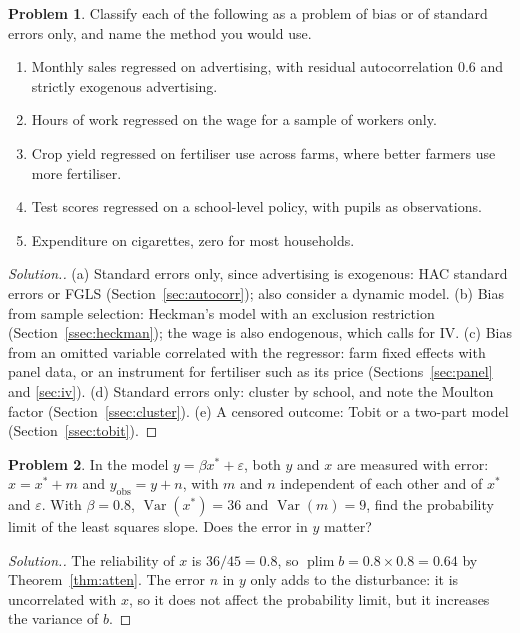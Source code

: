 \documentclass[11pt,a4paper]{article}
\numberwithin{equation}{section}
\DeclareMathOperator{\Var}{Var}
\DeclareMathOperator{\plim}{plim}
\theoremstyle{definition}
\newtheorem{problemx}{Problem}[subsection]
\newenvironment{problem}{\begin{problemx}}{\end{problemx}}
\newenvironment{solution}
  {\renewcommand{\qedsymbol}{}\begin{proof}[\textit{Solution}.]}
  {\end{proof}}
\begin{document}
\begin{problem}
Classify each of the following as a problem of bias or of standard errors only, and name the method you would use.
\begin{enumerate}[label=(\alph*)]
\item Monthly sales regressed on advertising, with residual autocorrelation $0.6$ and strictly exogenous advertising.
\item Hours of work regressed on the wage for a sample of workers only.
\item Crop yield regressed on fertiliser use across farms, where better farmers use more fertiliser.
\item Test scores regressed on a school-level policy, with pupils as observations.
\item Expenditure on cigarettes, zero for most households.
\end{enumerate}
\end{problem}

\begin{solution}
(a) Standard errors only, since advertising is exogenous: HAC standard errors or FGLS (Section~\ref{sec:autocorr}); also consider a dynamic model. (b) Bias from
sample selection: Heckman's model with an exclusion restriction (Section~\ref{ssec:heckman}); the wage is also endogenous, which calls for IV. (c) Bias from an
omitted variable correlated with the regressor: farm fixed effects with panel data, or an instrument for fertiliser such as its price (Sections~\ref{sec:panel}
and \ref{sec:iv}). (d) Standard errors only: cluster by school, and note the Moulton factor (Section~\ref{ssec:cluster}). (e) A censored outcome: Tobit or a
two-part model (Section~\ref{ssec:tobit}).
\end{solution}

\begin{problem}
In the model $y = \beta x^* + \varepsilon$, both $y$ and $x$ are measured with error: $x = x^* + m$ and $y_{\text{obs}} = y + n$, with $m$ and $n$ independent of each other and of $x^*$ and $\varepsilon$.
With $\beta = 0.8$, $\Var(x^*) = 36$ and $\Var(m) = 9$, find the probability limit of the least squares slope. Does the error in $y$ matter?
\end{problem}

\begin{solution}
The reliability of $x$ is $36/45 = 0.8$, so $\plim b = 0.8 \times 0.8 = 0.64$ by Theorem~\ref{thm:atten}. The error $n$ in $y$ only adds to the disturbance: it is uncorrelated with $x$, so it
does not affect the probability limit, but it increases the variance of $b$.
\end{solution}
\end{document}
